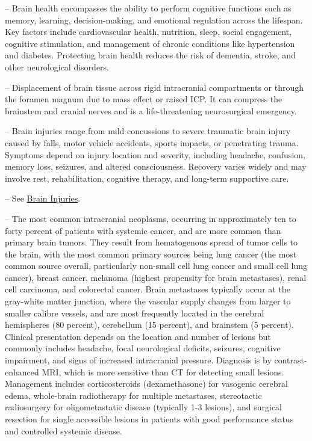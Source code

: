 -- Brain health encompasses the ability to perform cognitive functions such as memory, learning, decision-making, and emotional regulation across the lifespan. Key factors include cardiovascular health, nutrition, sleep, social engagement, cognitive stimulation, and management of chronic conditions like hypertension and diabetes. Protecting brain health reduces the risk of dementia, stroke, and other neurological disorders.

-- Displacement of brain tissue across rigid intracranial compartments or through the foramen magnum due to mass effect or raised ICP. It can compress the brainstem and cranial nerves and is a life-threatening neurosurgical emergency.

-- Brain injuries range from mild concussions to severe traumatic brain injury caused by falls, motor vehicle accidents, sports impacts, or penetrating trauma. Symptoms depend on injury location and severity, including headache, confusion, memory loss, seizures, and altered consciousness. Recovery varies widely and may involve rest, rehabilitation, cognitive therapy, and long-term supportive care.

-- See \hyperlink{Brain Injuries}{Brain Injuries}.

-- The most common intracranial neoplasms, occurring in approximately ten to forty percent of patients with systemic cancer, and are more common than primary brain tumors. They result from hematogenous spread of tumor cells to the brain, with the most common primary sources being lung cancer (the most common source overall, particularly non-small cell lung cancer and small cell lung cancer), breast cancer, melanoma (highest propensity for brain metastases), renal cell carcinoma, and colorectal cancer. Brain metastases typically occur at the gray-white matter junction, where the vascular supply changes from larger to smaller calibre vessels, and are most frequently located in the cerebral hemispheres (80 percent), cerebellum (15 percent), and brainstem (5 percent). Clinical presentation depends on the location and number of lesions but commonly includes headache, focal neurological deficits, seizures, cognitive impairment, and signs of increased intracranial pressure. Diagnosis is by contrast-enhanced MRI, which is more sensitive than CT for detecting small lesions. Management includes corticosteroids (dexamethasone) for vasogenic cerebral edema, whole-brain radiotherapy for multiple metastases, stereotactic radiosurgery for oligometastatic disease (typically 1-3 lesions), and surgical resection for single accessible lesions in patients with good performance status and controlled systemic disease.

